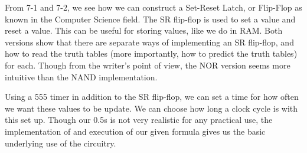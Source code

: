 \documentclass[%
 aip,
 jmp,
 amsmath,
 amssymb,
 reprint,%
 numerical,
 longbibliography,
]{revtex4-1}
\begin{document}
From 7-1 and 7-2, we see how we can construct a Set-Reset Latch, or Flip-Flop as known in the 
Computer Science field. The SR flip-flop is used to set a value and reset a value. This can be
useful for storing values, like we do in RAM. Both versions show that there are separate ways
of implementing an SR flip-flop, and how to read the truth tables (more importantly, how to
predict the truth tables) for each. Though from the writer's point of view, the NOR version
seems more intuitive than the NAND implementation.

Using a 555 timer in addition to the SR flip-flop, we can set a time for how often we want
these values to be update. We can choose how long a clock cycle is with this set up. Though
our 0.5s is not very realistic for any practical use, the implementation of and execution of
our given formula gives us the basic underlying use of the circuitry.
\end{document}
